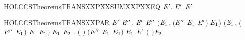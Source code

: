 \newcommand{\HOLCCSTheoremsTRANSXXPXXSUMXXP}{\UseVerbatim{HOLCCSTheoremsTRANSXXPXXSUMXXP}}
\begin{SaveVerbatim}{HOLCCSTheoremsTRANSXXPXXSUMXXPXXEQ}
\HOLTokenTurnstile{} \HOLSymConst{\HOLTokenForall{}}  \ensuremath{\HOLBoundVar{E}\sp{\prime{}}}.  \HOLSymConst{\ensuremath{+}}  \HOLTokenTransBegin{}\HOLTokenTransEnd \ensuremath{\HOLBoundVar{E}\sp{\prime{}}} \HOLSymConst{\HOLTokenEquiv{}}  \HOLTokenTransBegin{}\HOLTokenTransEnd \ensuremath{\HOLBoundVar{E}\sp{\prime{}}}
\end{SaveVerbatim}
\newcommand{\HOLCCSTheoremsTRANSXXPXXSUMXXPXXEQ}{\UseVerbatim{HOLCCSTheoremsTRANSXXPXXSUMXXPXXEQ}}
\begin{SaveVerbatim}{HOLCCSTheoremsTRANSXXPAR}
\HOLTokenTurnstile{} \HOLSymConst{\HOLTokenForall{}} \ensuremath{\HOLBoundVar{E}\sp{\prime{}}}  \ensuremath{\HOLBoundVar{E}\sp{\prime{}\prime{}}}.
      \HOLSymConst{\ensuremath{\mid}} \ensuremath{\HOLBoundVar{E}\sp{\prime{}}} \HOLTokenTransBegin{}\HOLTokenTransEnd \ensuremath{\HOLBoundVar{E}\sp{\prime{}\prime{}}} \HOLSymConst{\HOLTokenImp{}}
     \ensuremath{(}\HOLSymConst{\HOLTokenExists{}}\ensuremath{\HOLBoundVar{E}\sb{\mathrm{1}}}. \ensuremath{(}\ensuremath{\HOLBoundVar{E}\sp{\prime{}\prime{}}} \HOLSymConst{\ensuremath{=}} \ensuremath{\HOLBoundVar{E}\sb{\mathrm{1}}} \HOLSymConst{\ensuremath{\mid}} \ensuremath{\HOLBoundVar{E}\sp{\prime{}}}\ensuremath{)} \HOLSymConst{\HOLTokenConj{}}  \HOLTokenTransBegin{}\HOLTokenTransEnd \ensuremath{\HOLBoundVar{E}\sb{\mathrm{1}}}\ensuremath{)} \HOLSymConst{\HOLTokenDisj{}}
     \ensuremath{(}\HOLSymConst{\HOLTokenExists{}}\ensuremath{\HOLBoundVar{E}\sb{\mathrm{1}}}. \ensuremath{(}\ensuremath{\HOLBoundVar{E}\sp{\prime{}\prime{}}} \HOLSymConst{\ensuremath{=}}  \HOLSymConst{\ensuremath{\mid}} \ensuremath{\HOLBoundVar{E}\sb{\mathrm{1}}}\ensuremath{)} \HOLSymConst{\HOLTokenConj{}} \ensuremath{\HOLBoundVar{E}\sp{\prime{}}} \HOLTokenTransBegin{}\HOLTokenTransEnd \ensuremath{\HOLBoundVar{E}\sb{\mathrm{1}}}\ensuremath{)} \HOLSymConst{\HOLTokenDisj{}}
     \HOLSymConst{\HOLTokenExists{}}\ensuremath{\HOLBoundVar{E}\sb{\mathrm{1}}} \ensuremath{\HOLBoundVar{E}\sb{\mathrm{2}}} .
       \ensuremath{(} \HOLSymConst{\ensuremath{=}} \HOLConst{\ensuremath{\tau}}\ensuremath{)} \HOLSymConst{\HOLTokenConj{}} \ensuremath{(}\ensuremath{\HOLBoundVar{E}\sp{\prime{}\prime{}}} \HOLSymConst{\ensuremath{=}} \ensuremath{\HOLBoundVar{E}\sb{\mathrm{1}}} \HOLSymConst{\ensuremath{\mid}} \ensuremath{\HOLBoundVar{E}\sb{\mathrm{2}}}\ensuremath{)} \HOLSymConst{\HOLTokenConj{}}  \HOLTokenTransBegin{} \HOLTokenTransEnd \ensuremath{\HOLBoundVar{E}\sb{\mathrm{1}}} \HOLSymConst{\HOLTokenConj{}}
       \ensuremath{\HOLBoundVar{E}\sp{\prime{}}} \HOLTokenTransBegin{} \ensuremath{(} \ensuremath{)}\HOLTokenTransEnd \ensuremath{\HOLBoundVar{E}\sb{\mathrm{2}}}
\end{SaveVerbatim}
